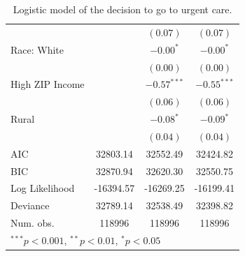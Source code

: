 \documentclass[12pt,twoside]{reedthesis}
\begin{document}
\begin{table}
\begin{center}
\begin{small}
\begin{tabular}{l c c c }
                                &               & $(0.07)$      & $(0.07)$      \\
  Race: White                   &               & $-0.00^{*}$   & $-0.00^{*}$   \\
                                &               & $(0.00)$      & $(0.00)$      \\
  High ZIP Income               &               & $-0.57^{***}$ & $-0.55^{***}$ \\
                                &               & $(0.06)$      & $(0.06)$      \\
  Rural                         &               & $-0.08^{*}$   & $-0.09^{*}$   \\
                                &               & $(0.04)$      & $(0.04)$      \\
  \hline
  AIC                           & 32803.14      & 32552.49      & 32424.82      \\
  BIC                           & 32870.94      & 32620.30      & 32550.75      \\
  Log Likelihood                & -16394.57     & -16269.25     & -16199.41     \\
  Deviance                      & 32789.14      & 32538.49      & 32398.82      \\
  Num. obs.                     & 118996        & 118996        & 118996        \\
  \hline
  \multicolumn{4}{l}{\tiny{$^{***}p<0.001$, $^{**}p<0.01$, $^*p<0.05$}}
  \end{tabular}
  \end{small}
  \caption{Logistic model of the decision to go to urgent care.}
  \label{table:coefficients}
  \end{center}
  \end{table}
  
\end{document}
